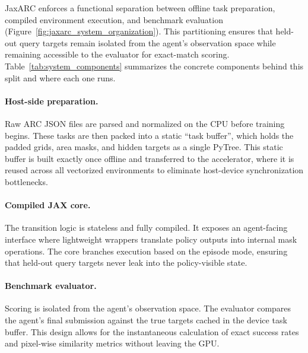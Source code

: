 JaxARC enforces a functional separation between offline task preparation, compiled environment execution, and benchmark evaluation (Figure~\ref{fig:jaxarc_system_organization}). This partitioning ensures that held-out query targets remain isolated from the agent's observation space while remaining accessible to the evaluator for exact-match scoring. Table~\ref{tab:system_components} summarizes the concrete components behind this split and where each one runs.

\paragraph{Host-side preparation.} Raw ARC JSON files are parsed and normalized on the CPU before training begins. These tasks are then packed into a static ``task buffer'', which holds the padded grids, area masks, and hidden targets as a single PyTree. This static buffer is built exactly once offline and transferred to the accelerator, where it is reused across all vectorized environments to eliminate host-device synchronization bottlenecks.

\paragraph{Compiled JAX core.} The transition logic is stateless and fully compiled. It exposes an agent-facing interface where lightweight wrappers translate policy outputs into internal mask operations. The core branches execution based on the episode mode, ensuring that held-out query targets never leak into the policy-visible state.

\paragraph{Benchmark evaluator.} Scoring is isolated from the agent's observation space. The evaluator compares the agent's final submission against the true targets cached in the device task buffer. This design allows for the instantaneous calculation of exact success rates and pixel-wise similarity metrics without leaving the GPU.

